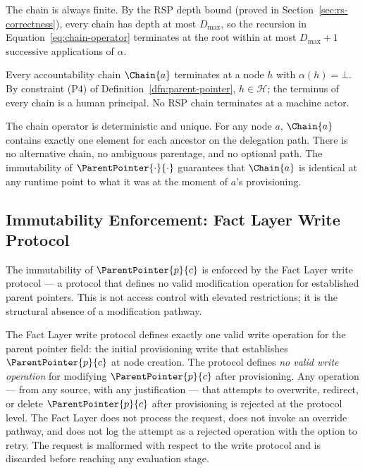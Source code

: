 The chain is always finite. By the RSP depth bound (proved in Section~\ref{sec:rs-correctness}), every chain has depth at most $D_{\max}$, so the recursion in Equation~\ref{eq:chain-operator} terminates at the root within at most $D_{\max} + 1$ successive applications of $\alpha$.

\begin{cor}\label{cor:chain-termination}
Every accountability chain $\Chain{a}$ terminates at a node $h$ with $\alpha(h) = \bot$. By constraint (P4) of Definition~\ref{dfn:parent-pointer}, $h \in \mathcal{H}$; the terminus of every chain is a human principal. No RSP chain terminates at a machine actor.
\end{cor}

The chain operator is deterministic and unique. For any node $a$, $\Chain{a}$ contains exactly one element for each ancestor on the delegation path. There is no alternative chain, no ambiguous parentage, and no optional path. The immutability of $\ParentPointer{\cdot}{\cdot}$ guarantees that $\Chain{a}$ is identical at any runtime point to what it was at the moment of $a$'s provisioning.

\subsection{Immutability Enforcement: Fact Layer Write Protocol}
\label{sec:fact-layer-enforcement}

The immutability of $\ParentPointer{p}{c}$ is enforced by the Fact Layer write protocol — a protocol that defines no valid modification operation for established parent pointers. This is not access control with elevated restrictions; it is the structural absence of a modification pathway.

The Fact Layer write protocol defines exactly one valid write operation for the parent pointer field: the initial provisioning write that establishes $\ParentPointer{p}{c}$ at node creation. The protocol defines \emph{no valid write operation} for modifying $\ParentPointer{p}{c}$ after provisioning. Any operation — from any source, with any justification — that attempts to overwrite, redirect, or delete $\ParentPointer{p}{c}$ after provisioning is rejected at the protocol level. The Fact Layer does not process the request, does not invoke an override pathway, and does not log the attempt as a rejected operation with the option to retry. The request is malformed with respect to the write protocol and is discarded before reaching any evaluation stage.

